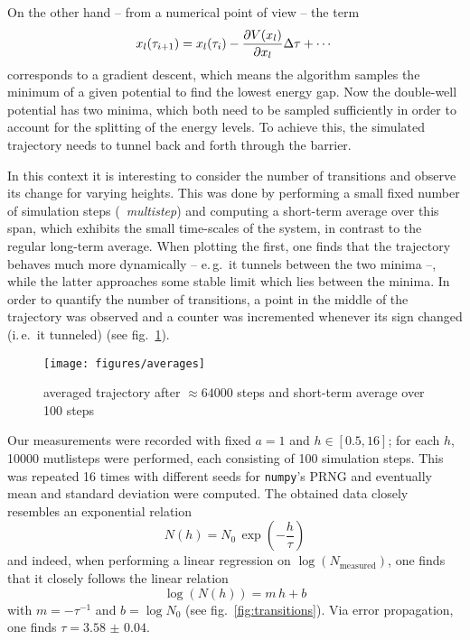 \documentclass[11pt,a4paper]{scrartcl}
\newcommand*{\figref}[1]{(see fig.~\ref{#1})}
\newcommand{\eg}{e.\,g.}
\newcommand{\ie}{i.\,e.}
\begin{document}
On the other hand -- from a numerical point of view -- the term
\begin{equation*}
    x_l(\tau_{i+1})=x_l(\tau_i)-\pdv{V(x_l)}{x_l}\Delta\tau+\dotsb
\end{equation*}
corresponds to a gradient descent, which means the algorithm samples the
minimum of a given potential to find the lowest energy gap. Now the double-well
potential has two minima, which both need to be sampled sufficiently in order
to account for the splitting of the energy levels. To achieve this, the
simulated trajectory needs to tunnel back and forth through the barrier.

In this context it is interesting to consider the number of transitions and
observe its change for varying heights. This was done by performing a small
fixed number of simulation steps (\textrightarrow~\emph{multistep}) and
computing a short-term average over this span, which exhibits the small
time-scales of the system, in contrast to the regular long-term average. When
plotting the first, one finds that the trajectory behaves much more dynamically
-- \eg~it tunnels between the two minima --, while the latter approaches some
stable limit which lies between the minima. In order to quantify the number of
transitions, a point in the middle of the trajectory was observed and a
counter was incremented whenever its sign changed (\ie~it tunneled)
\figref{fig:avg}.

\begin{figure}[h]
    \centering
    \texttt{[image: figures/averages]}
    \caption{averaged trajectory after $\approx\num{64000}$ steps and
    short-term average over \num{100} steps}
    \label{fig:avg}
\end{figure}

Our measurements were recorded with fixed $a=1$ and $h\in[0.5,16]$; for each
$h$, \num{10000} mutlisteps were performed, each consisting of 100 simulation
steps. This was repeated 16 times with different seeds for \texttt{numpy}'s
PRNG and eventually mean and standard deviation were computed. The obtained
data closely resembles an exponential relation
\begin{equation*}
    N(h)=N_0\,\exp\left(-\frac{h}{\tau}\right)
\end{equation*}
and indeed, when performing a linear regression on
$\log(N_{\mathrm{measured}})$, one finds that it closely follows the linear
relation
\begin{equation*}
    \log\left(N(h)\right)=m\,h+b
\end{equation*}
with $m=-\tau^{-1}$ and $b=\log{N_0}$ \figref{fig:transitions}. Via error
propagation, one finds
$\tau=\num{3.58(4)}$.
\end{document}
